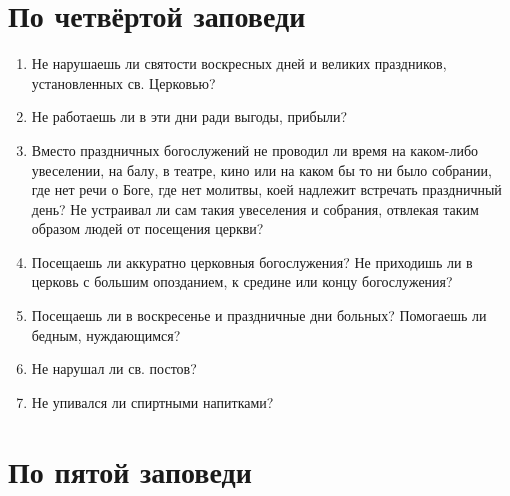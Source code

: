 \section{По четвёртой заповеди}\nopagebreak

\begin{mymulticols}

\begin{enumerate}

\item Не нарушаешь ли святости воскресных дней и великих праздников, установленных св. Церковью?

\item Не работаешь ли в эти дни ради выгоды, прибыли?

\item Вместо праздничных богослужений не проводил ли время на каком-либо увеселении, на балу, в театре, кино или на каком бы то ни было собрании, где нет речи о Боге, где нет молитвы, коей надлежит встречать праздничный день? Не устраивал ли сам такия увеселения и собрания, отвлекая таким образом людей от посещения церкви?

\item Посещаешь ли аккуратно церковныя богослужения? Не приходишь ли в церковь с большим опозданием, к средине или концу богослужения?

\item Посещаешь ли в воскресенье и праздничные дни больных? Помогаешь ли бедным, нуждающимся?

\item Не нарушал ли св. постов?

\item Не упивался ли спиртными напитками? 
\end{enumerate}

\end{mymulticols}

\section{По пятой заповеди}\nopagebreak

